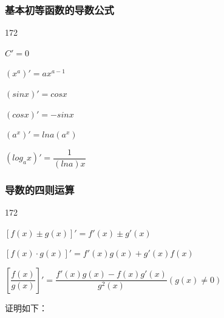 \subsubsection*{基本初等函数的导数公式}
\begin{dingautolist}{172}
    \item $C' = 0$
    \item $(x^a)' = ax^{a-1}$
    \item $(sinx)' = cosx$
    \item $(cosx)' = -sinx$
    \item $(a^x)' = lna(a^x)$
    \item $(log_ax)' = \dfrac{1}{(lna)x}$
\end{dingautolist}
\subsubsection*{导数的四则运算}
\begin{dingautolist}{172}
    \item $[f(x) \pm g(x)]' = f'(x) \pm g'(x)$
    \item $[f(x) \cdot g(x)]' = f'(x)g(x) + g'(x)f(x)$
    \item $\left[\dfrac{f(x)}{g(x)}\right]' = \dfrac{f'(x)g(x) - f(x)g'(x)}{g^2(x)} (g(x) \neq 0)$
\end{dingautolist}
证明如下：
